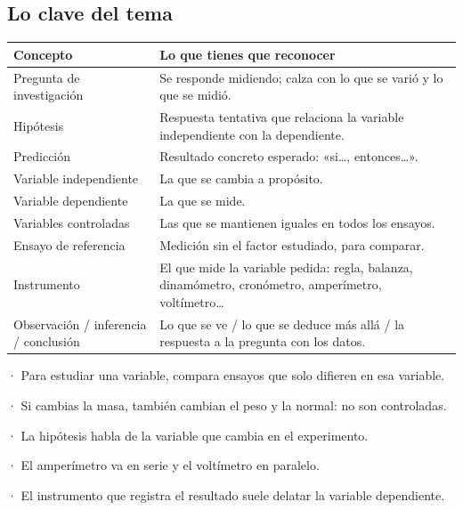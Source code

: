 \subsection{Lo clave del tema}
\begin{center}\small
\begin{tabularx}{\linewidth}{@{}>{\raggedright\arraybackslash\hsize=0.96\hsize}X>{\raggedright\arraybackslash\hsize=1.04\hsize}X@{}}
\toprule
\textbf{Concepto} & \textbf{Lo que tienes que reconocer} \\
\midrule
Pregunta de investigación & Se responde midiendo; calza con lo que se varió y lo que se midió. \\
Hipótesis & Respuesta tentativa que relaciona la variable independiente con la dependiente. \\
Predicción & Resultado concreto esperado: «si\dots{}, entonces\dots{}». \\
Variable independiente & La que se cambia a propósito. \\
Variable dependiente & La que se mide. \\
Variables controladas & Las que se mantienen iguales en todos los ensayos. \\
Ensayo de referencia & Medición sin el factor estudiado, para comparar. \\
Instrumento & El que mide la variable pedida: regla, balanza, dinamómetro, cronómetro, amperímetro, voltímetro\dots{} \\
Observación / inferencia / conclusión & Lo que se ve / lo que se deduce más allá / la respuesta a la pregunta con los datos. \\
\bottomrule
\end{tabularx}
\end{center}
 
\begin{clave}[{Recuerda}] · Para estudiar una variable, compara ensayos que solo difieren en esa variable.\par · Si cambias la masa, también cambian el peso y la normal: no son controladas.\par · La hipótesis habla de la variable que cambia en el experimento.\par · El amperímetro va en serie y el voltímetro en paralelo.\par · El instrumento que registra el resultado suele delatar la variable dependiente.\end{clave}
 
